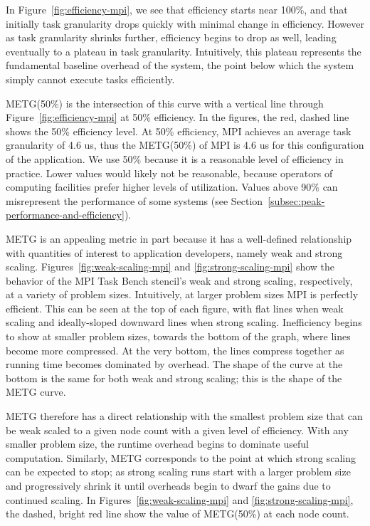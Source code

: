 In Figure~\ref{fig:efficiency-mpi}, we see that
efficiency starts near 100\%, and that initially task granularity
drops quickly with minimal change in efficiency. However as task
granularity shrinks further, efficiency begins to drop as well, leading
eventually to a plateau in task granularity. Intuitively, this plateau
represents the fundamental baseline overhead of the system, the point
below which the system simply cannot execute tasks efficiently.

METG(50\%) is the intersection of this curve with a vertical line through
Figure~\ref{fig:efficiency-mpi} at 50\% efficiency. In the figures, the red, dashed line shows the 50\% efficiency
level. At 50\% efficiency, MPI achieves an average task granularity of
4.6 us, thus the METG(50\%) of MPI is 4.6 us for this configuration of
the application. We use 50\% because it is a reasonable level of
efficiency in practice. Lower values would likely not be reasonable,
because operators of computing facilities prefer higher levels of
utilization. Values above 90\% can misrepresent the performance of
some systems (see
Section~\ref{subsec:peak-performance-and-efficiency}).

METG is an appealing metric in part because it has a well-defined
relationship with quantities of interest to application developers,
namely weak and strong scaling. Figures~\ref{fig:weak-scaling-mpi} and
\ref{fig:strong-scaling-mpi} show the behavior of the MPI Task Bench stencil's weak and strong
scaling, respectively, at a variety of problem sizes. Intuitively, at
larger problem sizes MPI is perfectly efficient. This can be seen at
the top of each figure, with flat lines when weak scaling and
ideally-sloped downward lines when strong scaling. Inefficiency begins
to show at smaller problem sizes, towards the bottom of the graph,
where lines become more compressed. At the
very bottom, the lines compress together as running time becomes dominated by overhead. The shape of the curve at the bottom is the same
for both weak and strong scaling; this is the shape of
the METG curve.




METG therefore has a direct relationship with the smallest problem
size that can be weak scaled to a given node count with a given level
of efficiency. With any smaller problem size, 
the runtime overhead begins to dominate useful
computation. Similarly, METG corresponds to the point at which strong
scaling can be expected to stop; as strong scaling runs start with a
larger problem size and progressively shrink it until overheads begin
to dwarf the gains due to continued scaling. In
Figures~\ref{fig:weak-scaling-mpi} and \ref{fig:strong-scaling-mpi},
the dashed, bright red line show the value of METG(50\%) at each node
count.

